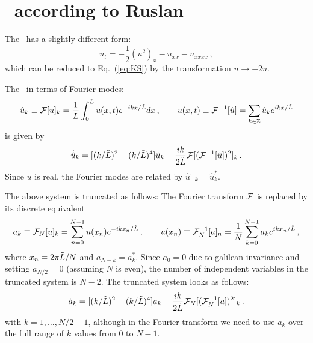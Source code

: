 %


\section{\KS\ according to Ruslan}
\label{sec:fourierRLD}

%
The \KSe\ has a slightly different form:
\begin{equation}
  u_t=-{\textstyle\frac{1}{2}}(u^2)_x-u_{xx}- u_{xxxx} \, ,
\end{equation}
which can be reduced to Eq.~(\ref{eq:KS}) by the transformation $u
\rightarrow -2u$.

The \KSe\ in terms of Fourier modes:
\begin{equation}
  \hat{u}_k \equiv {\cal F}[u]_k = \frac{1}{L}\int_0^L u(x,t) e^{-ikx/\tilde{L}}dx\,,
  \qquad u(x,t) \equiv {\cal F}^{-1}[\hat{u}] = \sum_{k\in{\mathbb Z}} \hat{u}_k e^{ikx/\tilde{L}}
\end{equation}
 is given by
\begin{equation}
  \dot{\hat{u}}_k =[(k/\tilde{L})^2-(k/\tilde{L})^4]\hat{u}_k -
  \frac{ik}{2\tilde{L}}{\cal F}[({\cal F}^{-1}[\hat{u}])^2]_k\,.
\end{equation}
Since $u$ is real, the Fourier modes are related by $\hat{u}_{-k} =
\hat{u}^\ast_k$.

The above system is truncated as follows: The Fourier transform
${\cal F}$ is replaced by its discrete equivalent
\begin{equation}
  a_k \equiv {\cal F}_N[u]_k = \sum_{n = 0}^{N-1} u(x_n)
  e^{-ikx_n/\tilde{L}}\,,\qquad u(x_n) \equiv {\cal F}_N^{-1}[a]_n
  = \frac{1}{N}\sum_{k = 0}^{N-1} a_k e^{ikx_n/\tilde{L}}\,,
\end{equation}
where $x_n = 2\pi\tilde{L}/N$ and $a_{N-k} = a^\ast_k$.  Since $a_0
= 0$ due to galilean invariance and setting $a_{N/2} = 0$ (assuming
$N$ is even), the number of independent variables in the truncated
system is $N-2$.  The truncated system looks as follows:
\begin{equation}
  \dot{a}_k =[(k/\tilde{L})^2-(k/\tilde{L})^4]a_k -
  \frac{ik}{2\tilde{L}}{\cal F}_N[({\cal F}_N^{-1}[a])^2]_k\,.
\end{equation}
with $k = 1,\ldots,N/2-1$, although in the Fourier transform we need
to use $a_k$ over the full range of $k$ values from 0 to $N-1$.


